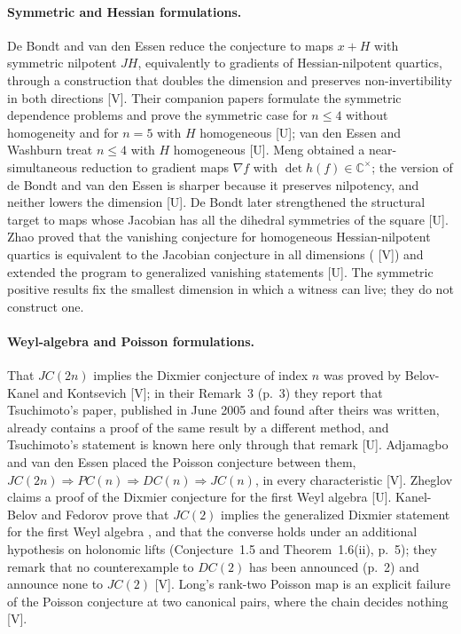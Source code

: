 \documentclass[11pt]{article}
\theoremstyle{remark}
\newcommand{\C}{\mathbb{C}}
\begin{document}
\paragraph{Symmetric and Hessian formulations.} De Bondt and van den Essen reduce the conjecture to maps $x+H$ with symmetric nilpotent $JH$, equivalently to gradients of Hessian-nilpotent quartics, through a construction that doubles the dimension and preserves non-invertibility in both directions \cite[Theorem~1.1, p.~2202; Corollary~1.3, p.~2203]{dBvdE2005} [V]. Their companion papers formulate the symmetric dependence problems and prove the symmetric case for $n\le4$ without homogeneity and for $n=5$ with $H$ homogeneous \cite{dBvdE2004, dBvdE2005b} [U]; van den Essen and Washburn treat $n\le4$ with $H$ homogeneous \cite{vdEW2004} [U]. Meng obtained a near-simultaneous reduction to gradient maps $\nabla f$ with $\det h(f)\in\C^\times$; the version of de Bondt and van den Essen is sharper because it preserves nilpotency, and neither lowers the dimension \cite{Meng2006} [U]. De Bondt later strengthened the structural target to maps whose Jacobian has all the dihedral symmetries of the square \cite{dBSym2014} [U]. Zhao proved that the vanishing conjecture for homogeneous Hessian-nilpotent quartics is equivalent to the Jacobian conjecture in all dimensions (\cite[Theorem~7.2, p.~30]{Zhao2004} [V]) and extended the program to generalized vanishing statements \cite[abstract, p.~1]{Zhao2007} [U]. The symmetric positive results fix the smallest dimension in which a witness can live; they do not construct one.

\paragraph{Weyl-algebra and Poisson formulations.} That $JC(2n)$ implies the Dixmier conjecture of index $n$ was proved by Belov-Kanel and Kontsevich \cite[Theorem~1, p.~2]{BKK2007} [V]; in their Remark~3 (p.~3) they report that Tsuchimoto's paper, published in June 2005 and found after theirs was written, already contains a proof of the same result by a different method, and Tsuchimoto's statement is known here only through that remark \cite{Tsuchimoto2005} [U]. Adjamagbo and van den Essen placed the Poisson conjecture between them, $JC(2n)\Rightarrow PC(n)\Rightarrow DC(n)\Rightarrow JC(n)$, in every characteristic \cite[Theorem~7, p.~14]{AvdE2007} [V]. Zheglov claims a proof of the Dixmier conjecture for the first Weyl algebra \cite[abstract, p.~1]{Zheglov2024} [U]. Kanel-Belov and Fedorov prove that $JC(2)$ implies the generalized Dixmier statement for the first Weyl algebra \cite[Theorem~1.6(i), p.~5; Proposition~6.2, p.~33]{KBF2026}, and that the converse holds under an additional hypothesis on holonomic lifts (Conjecture~1.5 and Theorem~1.6(ii), p.~5); they remark that no counterexample to $DC(2)$ has been announced (p.~2) and announce none to $JC(2)$ [V]. Long's rank-two Poisson map is an explicit failure of the Poisson conjecture at two canonical pairs, where the chain decides nothing \cite[Theorem~1.1, pp.~2--3]{LongPoisson2026} [V].
\end{document}
